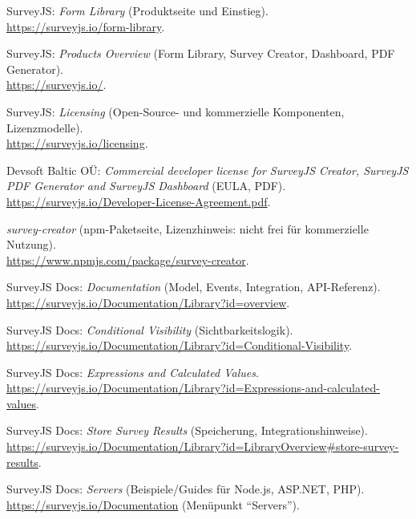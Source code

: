 \documentclass[11pt,a4paper]{article}
\begin{document}
\begin{thebibliography}{99}

SurveyJS: \emph{Form Library} (Produktseite und Einstieg).\\
\url{https://surveyjs.io/form-library}.

SurveyJS: \emph{Products Overview} (Form Library, Survey Creator, Dashboard, PDF Generator).\\
\url{https://surveyjs.io/}.

SurveyJS: \emph{Licensing} (Open-Source- und kommerzielle Komponenten, Lizenzmodelle).\\
\url{https://surveyjs.io/licensing}.

Devsoft Baltic OÜ: \emph{Commercial developer license for SurveyJS Creator, SurveyJS PDF Generator and SurveyJS Dashboard} (EULA, PDF).\\
\url{https://surveyjs.io/Developer-License-Agreement.pdf}.

\emph{survey-creator} (npm-Paketseite, Lizenzhinweis: nicht frei für kommerzielle Nutzung).\\
\url{https://www.npmjs.com/package/survey-creator}.

SurveyJS Docs: \emph{Documentation} (Model, Events, Integration, API-Referenz).\\
\url{https://surveyjs.io/Documentation/Library?id=overview}.

SurveyJS Docs: \emph{Conditional Visibility} (Sichtbarkeitslogik).\\
\url{https://surveyjs.io/Documentation/Library?id=Conditional-Visibility}.

SurveyJS Docs: \emph{Expressions and Calculated Values}.\\
\url{https://surveyjs.io/Documentation/Library?id=Expressions-and-calculated-values}.

SurveyJS Docs: \emph{Store Survey Results} (Speicherung, Integrationshinweise).\\
\url{https://surveyjs.io/Documentation/Library?id=LibraryOverview#store-survey-results}.

SurveyJS Docs: \emph{Servers} (Beispiele/Guides für Node.js, ASP.NET, PHP).\\
\url{https://surveyjs.io/Documentation} (Menüpunkt \enquote{Servers}).


\end{thebibliography}
\end{document}
